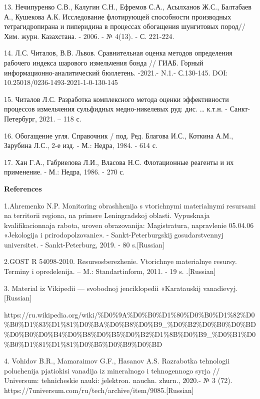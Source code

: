 13. Нечипуренко С.В., Калугин С.Н., Ефремов С.А., Асылханов Ж.С.,
Балтабаев А., Кушекова А.К. Исследование флотирующей способности
производных тетрагидропирана и пиперидина в процессах обогащения
шунгитовых пород// Хим. журн. Казахстана. - 2006. - № 4(13). - С.
221-224.

14. Л.С. Читалов, В.В. Львов. Сравнительная оценка методов определения
рабочего индекса шарового измельчения бонда // ГИАБ. Горный
информационно-аналитический бюллетень. -2021.- N.1.- С.130-145. DOI:
10.25018/0236-1493-2021-1-0-130-145

15. Читалов Л.С. Разработка комплексного метода оценки эффективности
процессов измельчения сульфидных медно-никелевых руд: дис. \ldots{}
к.т.н. - Санкт-Петербург, 2021. -- 118 с.

16. Обогащение угля. Справочник / под. Ред. Благова И.С., Коткина А.М.,
Зарубина Л.С., 2-е изд. - М.: Недра, 1984. - 614 с.

17. Хан Г.А., Габриелова Л.И., Власова Н.С. Флотационные реагенты и их
применение. - М.: Недра, 1986. - 270 с.

{\bfseries References}

1.Ahremenko N.P. Monitoring obrashhenija s vtorichnymi
material\textquotesingle nymi resursami na territorii regiona, na
primere Leningradskoj oblasti. Vypusknaja kvalifikacionnaja rabota,
uroven\textquotesingle{} obrazovanija: Magistratura, napravlenie
05.04.06 «Jekologija i prirodopol\textquotesingle zovanie». -
Sankt-Peterburgskij gosudarstvennyj universitet. - Sankt-Peterburg,
2019. - 80 s.{[}Russian{]}

2.GOST R 54098-2010. Resursosberezhenie. Vtorichnye
material\textquotesingle nye resursy. Terminy i opredelenija. -- M.:
Standartinform, 2011. - 19 s. .{[}Russian{]}

3. Material iz Vikipedii --- svobodnoj jenciklopedii «Karatauskij
vanadievyj.{[}Russian{]}

https://ru.wikipedia.org/wiki/\%D0\%9A\%D0\%B0\%D1\%80\%D0\%B0\%D1\%82\%D0\%B0\%D1\%83\%D1\%81\%D0\%BA\%D0\%B8\%D0\%B9\_\%D0\%B2\%D0\%B0\%D0\%BD\%D0\%B0\%D0\%B4\%D0\%B8\%D0\%B5\%D0\%B2\%D1\%8B\%D0\%B9\_\%D0\%B1\%D0\%B0\%D1\%81\%D1\%81\%D0\%B5\%D0\%B9\%D0\%BD

4. Vohidov B.R., Mamaraimov G.F., Hasanov A.S. Razrabotka tehnologii
poluchenija pjatiokisi vanadija iz mineral\textquotesingle nogo i
tehnogennogo syr\textquotesingle ja // Universum: tehnicheskie nauki:
jelektron. nauchn. zhurn., 2020.- № 3 (72).
https://7universum.com/ru/tech/archive/item/9085.{[}Russian{]}

